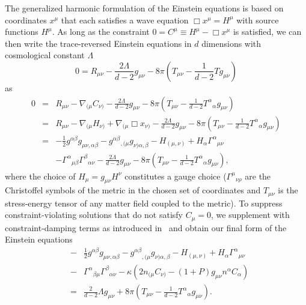 \documentclass[a4paper,11pt]{article}
\begin{document}
The generalized harmonic formulation of the Einstein equations is based on coordinates $x^\mu$ that each satisfies a wave equation $\Box x^{\mu}=H^\mu$ with source functions $H^\mu$.
As long as the constraint $0=C^\mu \equiv H^\mu-\Box x^\mu$ is satisfied, we can then write the trace-reversed Einstein equations in $d$ dimensions with cosmological constant $\Lambda$
\begin{equation}
0=R_{\mu\nu} - \frac{2\Lambda}{d-2} g_{\mu\nu} - 8\pi\left( T_{\mu\nu} - \frac{1}{d-2} T g_{\mu\nu} \right)
\end{equation}
as
\begin{eqnarray}
0
&=& R_{\mu\nu} - \nabla_{(\mu} C_{\nu)} - \frac{2\Lambda}{d-2} g_{\mu\nu} - 8\pi\left( T_{\mu\nu} - \frac{1}{d-2} {T^\alpha}_\alpha g_{\mu\nu} \right) \nonumber \\
&=& R_{\mu\nu} - \nabla_{(\mu} H_{\nu)} + \nabla_{(\mu} \Box{x}_{\nu)} - \frac{2\Lambda}{d-2} g_{\mu\nu} - 8\pi\left( T_{\mu\nu} - \frac{1}{d-2} {T^\alpha}_\alpha g_{\mu\nu} \right) \nonumber \\
&=& -\frac{1}{2} g^{\alpha\beta} g_{\mu\nu,\alpha\beta} - g^{\alpha\beta}{}_{,(\mu}g_{\nu)\alpha,\beta} - H_{(\mu,\nu)} + H_\alpha \Gamma^\alpha{}_{\mu\nu} \nonumber \\
&&- \Gamma^\alpha{}_{\mu\beta}\Gamma^\beta{}_{\alpha\nu} - \frac{2\Lambda}{d-2} g_{\mu\nu} - 8\pi\left( T_{\mu\nu} - \frac{1}{d-2} {T^\alpha}_\alpha g_{\mu\nu} \right) \nonumber,
\end{eqnarray}
where the choice of $H_\mu = g_{\mu\nu} H^\nu$ constitutes a gauge choice ($\Gamma^\mu{}_{\nu\rho}$ are the Christoffel symbols of the metric in the chosen set of coordinates and $T_{\mu\nu}$ is the stress-energy tensor of any matter field coupled to the metric). 
To suppress constraint-violating solutions that do not satisfy $C_\mu=0$, we supplement with constraint-damping terms as introduced in~\cite{Gundlach:2005eh} and obtain our final form of the Einstein equations
\begin{eqnarray}\label{eqn:efe_gh_modified}
&-& \frac{1}{2} g^{\alpha \beta} g_{\mu \nu, \alpha \beta} - 
{g^{\alpha \beta}}_{,(\mu} g_{\nu) \alpha, \beta} - H_{(\mu, \nu)} + H_\alpha {\Gamma^\alpha}_{\mu \nu} \nonumber \\
&-& {\Gamma^\alpha}_{\beta \mu} {\Gamma^\beta}_{\alpha \nu} - \kappa \left( 2 n_{(\mu} C_{\nu)} - (1+P) g_{\mu \nu} n^\alpha 
C_\alpha \right) \nonumber \\
&=&   \frac{2}{d-2} \Lambda g_{\mu \nu} + 8\pi \left( T_{\mu \nu} - 
\frac{1}{d-2} {T^\alpha}_\alpha g_{\mu \nu} \right).
\end{eqnarray}
\end{document}
